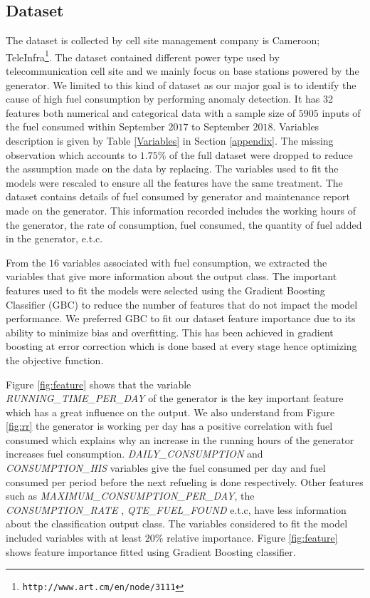 \documentclass[a4paper,fleqn]{cas-dc}
\begin{document}
\subsection{Dataset} \label{sec:desc}

The dataset is collected by cell site management company is Cameroon; TeleInfra\footnote{{\tt http://www.art.cm/en/node/3111}}. The dataset contained different power type used by telecommunication cell site and we mainly focus on base stations powered by the generator. We limited to this kind of dataset as our major goal is to identify the cause of high fuel consumption by performing anomaly detection. It has 32 features both numerical and categorical data with a sample size of $5905$ inputs of the fuel consumed within September $2017$ to September $2018$. Variables description is given by Table \ref{Variables} in Section \ref{appendix}. The missing observation which accounts to $1.75\%$ of the full dataset were dropped to reduce the assumption made on the data by replacing. The variables used to fit the models were rescaled to ensure all the features have the same treatment. The dataset contains details of fuel consumed by generator and maintenance report made on the generator. This information recorded includes the working hours of the generator, the rate of consumption, fuel consumed, the quantity of fuel added in the generator, e.t.c.

From the $16$ variables associated with fuel consumption, we extracted the variables that give more information about the output class. 
The important features used to fit the models were selected using the
Gradient Boosting Classifier (GBC) to reduce the number of features that do not impact the model performance. We preferred GBC to fit our dataset feature importance due to its ability to minimize bias and overfitting. This has been achieved in gradient boosting at error correction which is done based at every stage hence optimizing the objective function.

Figure \ref{fig:feature} shows that the variable\\ \textit{RUNNING\_TIME\_PER\_DAY} of the generator is the key important feature which has a great influence on the output. We also understand from Figure \ref{fig:rr} the generator is working per day has a positive correlation with fuel consumed which explains why an increase in the running hours of the generator increases fuel consumption. \textit{DAILY\_CONSUMPTION}  and \textit{CONSUMPTION\_HIS} variables give the fuel consumed per day and fuel consumed per period before the next refueling is done respectively. Other features such as \textit{MAXIMUM\_CONSUMPTION\_PER\_DAY}, the \textit{CONSUMPTION\_RATE }, \textit{QTE\_FUEL\_FOUND} e.t.c, have less information about the classification output class. The variables considered to fit the model included variables with at least $20\%$ relative importance. Figure \ref{fig:feature} shows feature importance fitted using Gradient Boosting classifier.
\end{document}

